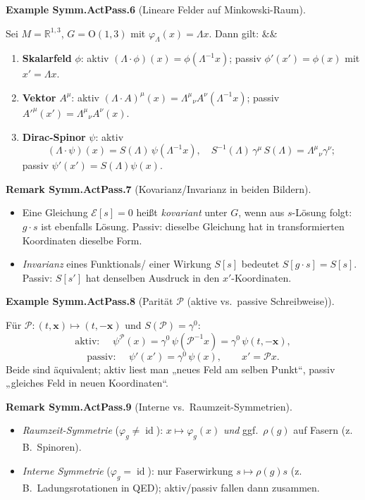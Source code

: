 \documentclass[10pt, letterpaper]{article}
\newcommand{\id}{\operatorname{id}}
\newcommand{\R}{\mathbb{R}}
\newcommand{\Ogroup}{\mathrm{O}}
\newenvironment{romanenum}[1][]
  {%
    \ifx&#1&
    \else
      \textbf{#1}\quad
    \fi
    \begin{enumerate}[label=\roman*)]
  }
  {%
    \end{enumerate}%
  }
\newcommand{\CustomHeading}[3]{%
  \par\medskip\noindent%
  \textbf{#1 #2} \textnormal{(#3)}.\enskip%
}
\newenvironment{REM}[2]{\begin{unitbox}\CustomHeading{Remark}{#1}{#2}}{\end{unitbox}}
\newenvironment{EXA}[2]{\begin{unitbox}\CustomHeading{Example}{#1}{#2}}{\end{unitbox}}
\begin{document}
\begin{EXA}{Symm.ActPass.6}{Lineare Felder auf Minkowski-Raum}
Sei $M=\R^{1,3}$, $G=\Ogroup(1,3)$ mit $\varphi_\Lambda(x)=\Lambda x$. Dann gilt:
\begin{romanenum}
  \item \textbf{Skalarfeld} $\phi$: aktiv $(\Lambda\cdot\phi)(x)=\phi(\Lambda^{-1}x)$; passiv $\phi'(x')=\phi(x)$ mit $x'=\Lambda x$.
  \item \textbf{Vektor} $A^\mu$: aktiv $(\Lambda\cdot A)^\mu(x)=\Lambda^\mu{}_\nu A^\nu(\Lambda^{-1}x)$; passiv $A'^\mu(x')=\Lambda^\mu{}_\nu A^\nu(x)$.
  \item \textbf{Dirac-Spinor} $\psi$: aktiv
  \[
    (\Lambda\cdot\psi)(x)=S(\Lambda)\,\psi(\Lambda^{-1}x),\quad
    S^{-1}(\Lambda)\,\gamma^\mu\,S(\Lambda)=\Lambda^\mu{}_\nu\gamma^\nu;
  \]
  passiv $\psi'(x')=S(\Lambda)\psi(x)$.
\end{romanenum}
\end{EXA}

\begin{REM}{Symm.ActPass.7}{Kovarianz/Invarianz in beiden Bildern}
\begin{itemize}
  \item Eine Gleichung $\mathcal E[s]=0$ heißt \emph{kovariant} unter $G$, wenn aus $s$-Lösung folgt: $g\cdot s$ ist ebenfalls Lösung. Passiv: dieselbe Gleichung hat in transformierten Koordinaten dieselbe Form.
  \item \emph{Invarianz} eines Funktionals/ einer Wirkung $S[s]$ bedeutet $S[g\cdot s]=S[s]$. Passiv: $S[s']$ hat denselben Ausdruck in den $x'$-Koordinaten.
\end{itemize}
\end{REM}

\begin{EXA}{Symm.ActPass.8}{Parität $\mathcal P$ (aktive vs.\ passive Schreibweise)}
Für $\mathcal P:(t,\mathbf x)\mapsto(t,-\mathbf x)$ und $S(\mathcal P)=\gamma^0$:
\[
\text{aktiv: }\quad \psi^{\mathcal P}(x)=\gamma^0\,\psi(\mathcal P^{-1}x)=\gamma^0\,\psi(t,-\mathbf x),
\]
\[
\text{passiv: }\quad \psi'(x')=\gamma^0\,\psi(x),\qquad x'=\mathcal P x.
\]
Beide sind äquivalent; aktiv liest man „neues Feld am selben Punkt“, passiv „gleiches Feld in neuen Koordinaten“.
\end{EXA}

\begin{REM}{Symm.ActPass.9}{Interne vs.\ Raumzeit-Symmetrien}
\begin{itemize}
  \item \emph{Raumzeit-Symmetrie} ($\varphi_g\neq \id$): $x\mapsto \varphi_g(x)$ \emph{und} ggf.\ $\rho(g)$ auf Fasern (z.\,B.\ Spinoren).
  \item \emph{Interne Symmetrie} ($\varphi_g=\id$): nur Faserwirkung $s\mapsto \rho(g)s$ (z.\,B.\ Ladungsrotationen in QED); aktiv/passiv fallen dann zusammen.
\end{itemize}
\end{REM}
\end{document}
